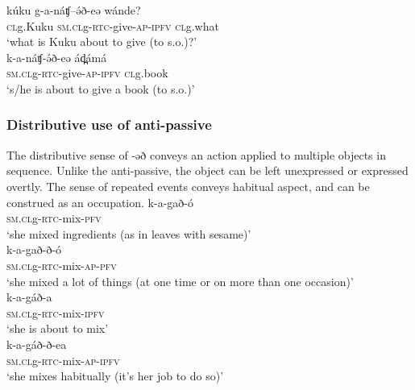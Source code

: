 \ex \gll	kúku 	g-a-náʧ--ə́ð-eə 			wánde?\\		
	\textsc{cl}g.Kuku	\textsc{sm.cl}g-\textsc{rtc}-give-\textsc{ap-\textsc{ipfv}}	\textsc{cl}g.what\\
	\trans ‘what is Kuku about to give (to s.o.)?’\\

\ex \gll	k-a-náʧ-ə́ð-eə 		ád̪ámá  \\
	\textsc{sm.cl}g-\textsc{rtc}-give-\textsc{ap-\textsc{ipfv}}	\textsc{cl}g.book \\
	\trans ‘s/he is about to give a book (to s.o.)’\\
\z
\z

\subsubsection{Distributive use of anti-passive}
The distributive sense of -əð conveys an action applied to multiple objects in sequence. Unlike the anti-passive, the object can be left unexpressed or expressed overtly. The sense of repeated events conveys habitual aspect, and can be construed as an occupation.
\ea
\ea \gll	k-a-gað-ó\\		
		\textsc{sm.cl}g-\textsc{rtc}-mix-\textsc{pfv}\\
		\trans ‘she mixed ingredients (as in leaves with sesame)’\\

\ex \gll	k-a-gað-ð-ó	\\
	\textsc{sm.cl}g-\textsc{rtc}-mix-\textsc{ap-\textsc{pfv}}\\
	\trans ‘she mixed a lot of things (at one time or on more than one occasion)’\\ %

\ex \gll	k-a-gáð-a		\\
		\textsc{sm.cl}g-\textsc{rtc}-mix-\textsc{ipfv}\\
 		\trans ‘she is about to mix’\\

\ex \gll 	 k-a-gáð-ð-ea	\\
	\textsc{sm.cl}g-\textsc{rtc}-mix-\textsc{ap-\textsc{ipfv}}\\
	\trans ‘she mixes habitually (it’s her job to do so)’\\
\z
\z %

%


